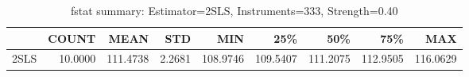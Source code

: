 \begin{table}[ht]
\centering
\caption{fstat summary: Estimator=2SLS, Instruments=333, Strength=0.40}
\begin{tabular}{lrrrrrrrr}
\toprule
 & COUNT & MEAN & STD & MIN & 25\% & 50\% & 75\% & MAX \\
\midrule
2SLS & 10.0000 & 111.4738 & 2.2681 & 108.9746 & 109.5407 & 111.2075 & 112.9505 & 116.0629 \\
\bottomrule
\end{tabular}
\end{table}
